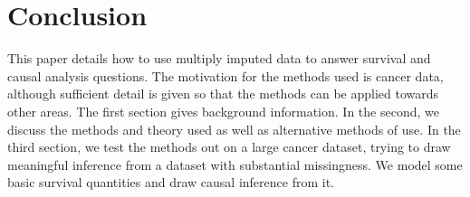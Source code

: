 \chapter{Conclusion}
This paper details how to use multiply imputed data to answer survival and causal analysis questions. The motivation for the methods used is cancer data, although sufficient detail is given so that the methods can be applied towards other areas. The first section gives background information. In the second, we discuss the methods and theory used as well as alternative methods of use. In the third section, we test the methods out on a large cancer dataset, trying to draw meaningful inference from a dataset with substantial missingness. We model some basic survival quantities and draw causal inference from it.
